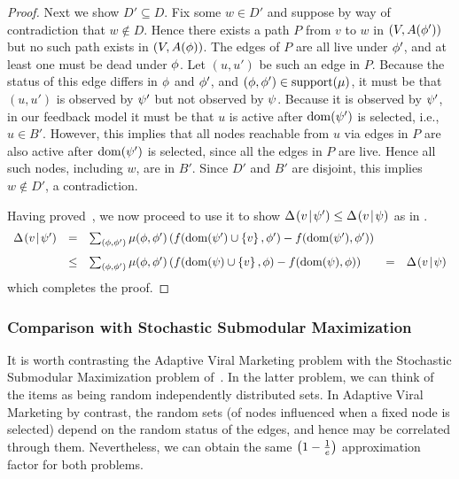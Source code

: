 \begin{proof}
Next we show $D' \subseteq D$.  Fix some $w \in D'$ and suppose by way of contradiction that $w
\notin D$.  Hence there exists a path $P$ from $v$ to $w$ in $(V,
\alive{\rlz'})$ but no such path exists in $(V, \alive{\rlz})$.  The
edges of $P$ are all live under $\rlz'$, and at least one must be
dead under $\rlz$.  Let $(u, u')$ be such an edge in $P$.  Because 
the status of this edge differs in $\rlz$ and $\rlz'$, and 
$(\rlz, \rlz') \in \support(\mu)$, it must be that $(u, u')$ is
observed by $\prlz'$ but not observed by $\prlz$.
Because it is observed by $\prlz'$, in our feedback model it must be that $u$ is active
after $\dom(\prlz')$ is selected, i.e., $u \in B'$.
However, this implies that all nodes reachable from $u$ via edges in
$P$ are also active after $\dom(\prlz')$ is selected, since all the
edges in $P$ are live.  Hence all such nodes, including $w$, are in
$B'$.  Since $D'$ and $B'$ are disjoint, this implies $w \notin D'$, a
contradiction.


Having proved~, we now proceed to use it to show
$\diff{\prlz'}{v} \le \diff{\prlz}{v}$ as in
.
\[
\begin{array}{lllll}
  \label{eq:2vm}
\diff{\prlz'}{v} & = & \sum_{(\rlz, \rlz')} \mu(\rlz, \rlz') \paren{
f(\dom(\prlz') \cup \set{v}, \rlz') - f(\dom(\prlz'),
  \rlz')} &  & \\[3mm]
  & \le & \sum_{(\rlz, \rlz')} \mu(\rlz, \rlz') \paren{ f(\dom(\prlz) \cup \set{v}, \rlz) - f(\dom(\prlz),
  \rlz)} & = & \diff{\prlz}{v}
\end{array}
\]
which completes the proof.
\end{proof}

\subsubsection{Comparison with Stochastic Submodular Maximization}
It is worth contrasting the Adaptive Viral Marketing problem with the
Stochastic Submodular Maximization problem
of~.  In the latter problem, we
can think of the items as being
random independently distributed sets. 
In Adaptive Viral Marketing by contrast, the random sets (of nodes
influenced when a fixed node is selected) depend on the random status
of the edges, and hence may be correlated through them. 
Nevertheless, we can obtain the same $\paren{1 - \frac1e}$
approximation factor for both problems.\\


